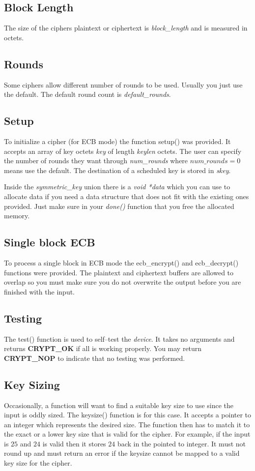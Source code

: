 \documentclass[synpaper]{book}
\begin{document}
\subsection{Block Length}
The size of the ciphers plaintext or ciphertext is \textit{block\_length} and is measured in octets.

\subsection{Rounds}
Some ciphers allow different number of rounds to be used.  Usually you just use the default.  The default round count is \textit{default\_rounds}.

\subsection{Setup}
To initialize a cipher (for ECB mode) the function setup() was provided.  It accepts an array of key octets \textit{key} of length \textit{keylen} octets.  The user
can specify the number of rounds they want through \textit{num\_rounds} where $num\_rounds = 0$ means use the default.  The destination of a scheduled key is stored
in \textit{skey}.

Inside the \textit{symmetric\_key} union there is a \textit{void *data} which you can use to allocate data if you need a data structure that does not fit with the existing
ones provided.  Just make sure in your \textit{done()} function that you free the allocated memory.

\subsection{Single block ECB}
To process a single block in ECB mode the ecb\_encrypt() and ecb\_decrypt() functions were provided.  The plaintext and ciphertext buffers are allowed to overlap so you
must make sure you do not overwrite the output before you are finished with the input.

\subsection{Testing}
The test() function is used to self--test the \textit{device}.  It takes no arguments and returns \textbf{CRYPT\_OK} if all is working properly.  You may return
\textbf{CRYPT\_NOP} to indicate that no testing was performed.

\subsection{Key Sizing}
Occasionally, a function will want to find a suitable key size to use since the input is oddly sized.  The keysize() function is for this case.  It accepts a
pointer to an integer which represents the desired size.  The function then has to match it to the exact or a lower key size that is valid for the cipher.  For
example, if the input is $25$ and $24$ is valid then it stores $24$ back in the pointed to integer.  It must not round up and must return an error if the keysize
 cannot be mapped to a valid key size for the cipher.
\end{document}
